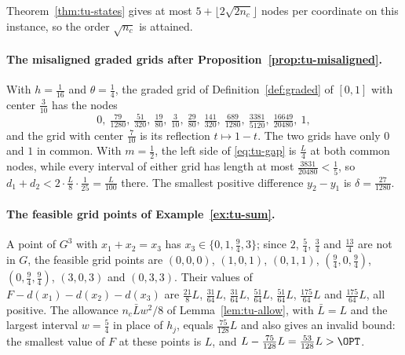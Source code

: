 Theorem~\ref{thm:tu-states} gives at most $5+\lfloor2\sqrt{2n_c}\rfloor$ nodes
per coordinate on this instance, so the order $\sqrt{n_c}$ is attained.

\paragraph{The misaligned graded grids after Proposition~\ref{prop:tu-misaligned}.}
With $h=\frac1{16}$ and $\theta=\frac14$, the graded grid of
Definition~\ref{def:graded} of $[0,1]$ with center $\frac3{10}$ has the nodes
\[
0,\ \tfrac{79}{1280},\ \tfrac{51}{320},\ \tfrac{19}{80},\ \tfrac3{10},\
\tfrac{29}{80},\ \tfrac{141}{320},\ \tfrac{689}{1280},\ \tfrac{3381}{5120},\
\tfrac{16649}{20480},\ 1,
\]
and the grid with center $\frac7{10}$ is its reflection $t\mapsto1-t$. The
two grids have only $0$ and $1$ in common. With $m=\frac12$, the left side of
\eqref{eq:tu-gap} is $\frac L4$ at both common nodes, while every interval
of either grid has length at most $\frac{3831}{20480}<\frac15$, so
$d_1+d_2<2\cdot\frac L8\cdot\frac1{25}=\frac L{100}$ there. The smallest positive difference
$y_2-y_1$ is $\delta=\frac{27}{1280}$.

\paragraph{The feasible grid points of Example~\ref{ex:tu-sum}.}
A point of $G^3$ with $x_1+x_2=x_3$ has $x_3\in\{0,1,\frac94,3\}$; since
$2$, $\frac54$, $\frac34$ and $\frac{13}4$ are not in $G$, the feasible grid
points are $(0,0,0)$, $(1,0,1)$, $(0,1,1)$, $(\frac94,0,\frac94)$,
$(0,\frac94,\frac94)$, $(3,0,3)$ and $(0,3,3)$. Their values of
$F-d(x_1)-d(x_2)-d(x_3)$ are $\frac{21}8L$, $\frac{31}{64}L$,
$\frac{31}{64}L$, $\frac{51}{64}L$, $\frac{51}{64}L$, $\frac{175}{64}L$ and
$\frac{175}{64}L$, all positive. The allowance $n_c\bar Lw^2/8$ of
Lemma~\ref{lem:tu-allow}, with $\bar L=L$ and the largest interval
$w=\frac54$ in place of $h_j$, equals $\frac{75}{128}L$ and also gives an
invalid bound: the smallest value of $F$ at these points is $L$, and
$L-\frac{75}{128}L=\frac{53}{128}L>\OPT$.
